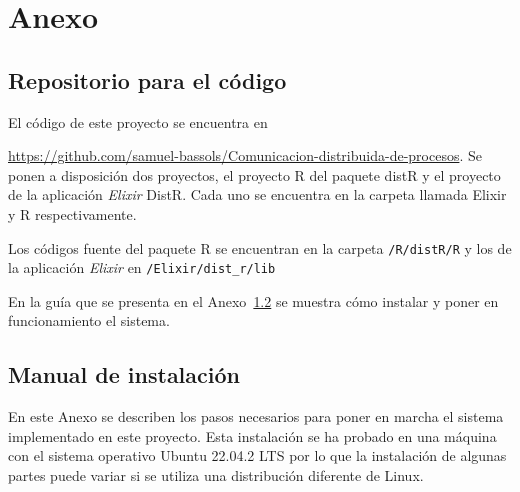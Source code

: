 \appendix\setcounter{chapter}{1}
\chapter{Anexo}
\section{Repositorio para el código}\label{apendix:anex1}
El código de este proyecto se encuentra en 

\url{https://github.com/samuel-bassols/Comunicacion-distribuida-de-procesos}.
Se ponen a disposición dos proyectos, el proyecto R del paquete distR y el proyecto de la aplicación \textit{Elixir} DistR. Cada uno se encuentra en la carpeta llamada Elixir y R respectivamente. 

Los códigos fuente del paquete R se encuentran en la carpeta \texttt{/R/distR/R} y los de la aplicación \textit{Elixir} en \texttt{/Elixir/dist\_r/lib} 

En la guía que se presenta en el Anexo~\ref{guia} se muestra cómo instalar y poner en funcionamiento el sistema. 
\section{Manual de instalación}\label{guia}
En este Anexo se describen los pasos necesarios para poner en marcha el sistema implementado en este proyecto. Esta instalación se ha probado en una máquina con el sistema operativo Ubuntu 22.04.2 LTS por lo que la instalación de algunas partes puede variar si se utiliza una distribución diferente de Linux.
